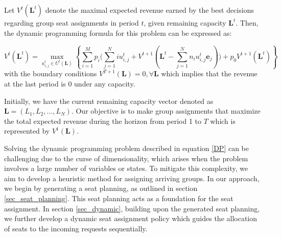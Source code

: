 Let $V^{t}(\mathbf{L}^{t})$ denote the maximal expected revenue earned by the best decisions regarding group seat assignments in period $t$, given remaining capacity $\mathbf{L}^{t}$. Then, the dynamic programming formula for this problem can be expressed as:

\begin{equation}\label{DP}
V^{t}(\mathbf{L}^{t}) = \max_{u_{i,j}^{t} \in U^{t}(\mathbf{L})}\left\{ \sum_{i=1}^{M} p_i \bigl( \sum_{j=1}^{N} i u_{i,j}^{t} + V^{t+1}(\mathbf{L}^{t}- \sum_{j=1}^{N} n_i u_{i,j}^{t}\mathbf{e}_j)\bigr) + p_0 V^{t+1}(\mathbf{L}^{t})\right\}
\end{equation}
with the boundary conditions $V^{T+1}(\mathbf{L}) = 0, \forall \mathbf{L}$ which implies that the revenue at the last period is 0 under any capacity.

Initially, we have the current remaining capacity vector denoted as $\mathbf{L} = (L_1, L_2, \ldots, L_N)$. Our objective is to make group assignments that maximize the total expected revenue during the horizon from period 1 to $T$ which is represented by $V^{1}(\mathbf{L})$.

Solving the dynamic programming problem described in equation \eqref{DP} can be challenging due to the curse of dimensionality, which arises when the problem involves a large number of variables or states. To mitigate this complexity, we aim to develop a heuristic method for assigning arriving groups. In our approach, we begin by generating a seat planning, as outlined in section \ref{sec_seat_planning}. This seat planning acts as a foundation for the seat assignment. In section \ref{sec_dynamic}, building upon the generated seat planning, we further develop a dynamic seat assignment policy which guides the allocation of seats to the incoming requests sequentially. 


